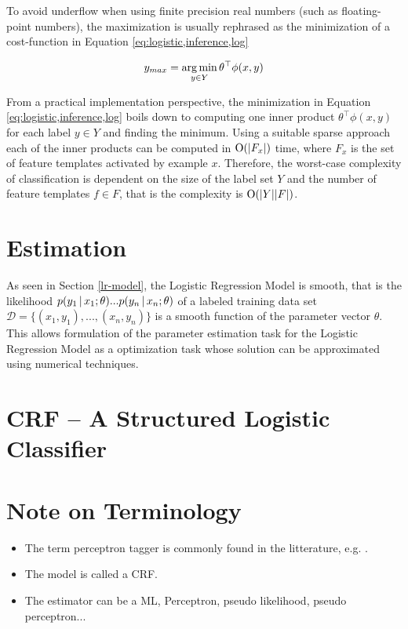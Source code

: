 To avoid underflow when using finite precision real numbers (such as
floating-point numbers), the maximization is usually rephrased as the
minimization of a cost-function in Equation
\ref{eq:logistic,inference,log}

\begin{equation}y_{max} = \operatorname*{arg\,min}_{y\in Y} \theta^\top \phi(x,y)\label{eq:logistic,inference,log}\end{equation}

From a practical implementation perspective, the minimization in
Equation \ref{eq:logistic,inference,log} boils down to computing one
inner product $\theta^\top \phi(x,y)$ for each label $y \in Y$ and
finding the minimum. Using a suitable sparse approach each of the
inner products can be computed in $\mbox{${\rm O}$}(|F_x|)$ time, where $F_x$ is the
set of feature templates activated by example $x$. Therefore, the
worst-case complexity of classification is dependent on the size of
the label set $Y$ and the number of feature templates $f \in F$, that
is the complexity is $\mbox{${\rm O}$}(|Y||F|)$.

\section{Estimation}

As seen in Section \ref{lr-model}, the Logistic Regression Model is
smooth, that is the likelihood $p(y_1 \mbox{$ \, | \, $} x_1 \mbox{$ ; \, $} \theta)
... p(y_n \mbox{$ \, | \, $} x_n \mbox{$ ; \, $} \theta)$ of a labeled training data set
$\mathcal{D} = \{(x_1,y_1), ...,(x_n,y_n)\}$ is a smooth function of
the parameter vector $\theta$. This allows formulation of the
parameter estimation task for the Logistic Regression Model as a
optimization task whose solution can be approximated using numerical
techniques.


\section{CRF -- A Structured Logistic Classifier}

\section{Note on Terminology}
\begin{itemize}
\item The term perceptron tagger is commonly found in the litterature, e.g. \cite{Collins2002}.
\item The model is called a CRF.
\item The estimator can be a ML, Perceptron, pseudo likelihood, pseudo
  perceptron...
\end{itemize}

